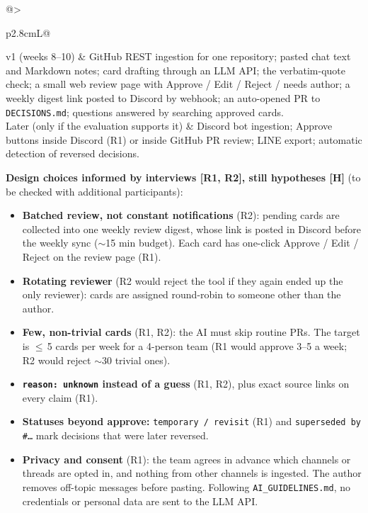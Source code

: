 \documentclass[11pt,a4paper]{article}
\newcommand{\code}[1]{\texttt{#1}}
\begin{document}
{\small
\begin{tabularx}{\linewidth}{@{}>{\bfseries\raggedright\arraybackslash}p{2.8cm}L@{}}
\toprule
v1 (weeks 8--10) & GitHub REST ingestion for one repository; pasted chat text and Markdown notes; card drafting through an LLM API; the verbatim-quote check; a small web review page with Approve / Edit / Reject / needs author; a weekly digest link posted to Discord by webhook; an auto-opened PR to \code{DECISIONS.md}; questions answered by searching approved cards.\\
Later (only if the evaluation supports it) & Discord bot ingestion; Approve buttons inside Discord (R1) or inside GitHub PR review; LINE export; automatic detection of reversed decisions.\\
\bottomrule
\end{tabularx}
}

\textbf{Design choices informed by interviews [R1, R2], still hypotheses [H]} (to be checked with additional participants):
\begin{itemize}
  \item \textbf{Batched review, not constant notifications} (R2): pending cards are collected into one weekly review digest, whose link is posted in Discord before the weekly sync ($\sim$15 min budget). Each card has one-click Approve / Edit / Reject on the review page (R1).
  \item \textbf{Rotating reviewer} (R2 would reject the tool if they again ended up the only reviewer): cards are assigned round-robin to someone other than the author.
  \item \textbf{Few, non-trivial cards} (R1, R2): the AI must skip routine PRs. The target is $\leq$\,5 cards per week for a 4-person team (R1 would approve 3--5 a week; R2 would reject $\sim$30 trivial ones).
  \item \textbf{\code{reason: unknown} instead of a guess} (R1, R2), plus exact source links on every claim (R1).
  \item \textbf{Statuses beyond approve:} \code{temporary / revisit} (R1) and \code{superseded by \#\ldots} mark decisions that were later reversed.
  \item \textbf{Privacy and consent} (R1): the team agrees in advance which channels or threads are opted in, and nothing from other channels is ingested. The author removes off-topic messages before pasting. Following \code{AI\_GUIDELINES.md}, no credentials or personal data are sent to the LLM API.
\end{itemize}
\end{document}

